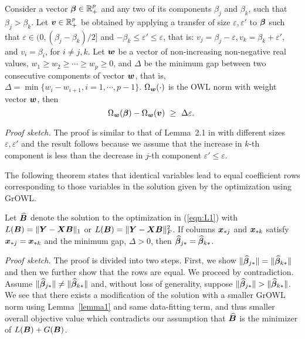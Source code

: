 \begin{lemma}\label{lemma1}
Consider a vector $\boldsymbol{\beta} \in {\mathbb R}^p_+$ and any two of its components $\beta_j$ and $\beta_k$, such that $\beta_j > \beta_k$. Let $\boldsymbol{v} \in {\mathbb R}^p_+$ be obtained by applying a transfer of size $\varepsilon, \varepsilon'$ to $\boldsymbol{\beta}$ such that $\varepsilon \in (0, (\beta_j - \beta_k )/2]$ and $ -\beta_k \leq \varepsilon' \leq \varepsilon$, that is: $v_j = \beta_j - \varepsilon, v_k = \beta_k + \varepsilon'$, and $v_i = \beta_i$, for $i \neq j, k$. Let $\boldsymbol{w}$ be a vector of non-increasing non-negative real values, $w_1 \geq w_2 \geq \cdots \geq w_p \geq 0$, and $\Delta$ be the minimum gap between two consecutive components of vector
$\boldsymbol{w}$, that is, $\Delta = \min\{w_i - w_{i+1}, i = 1, \cdots, p - 1\}$. $\Omega_{\boldsymbol{w}}(\cdot)$ is the OWL norm with weight vector $\boldsymbol{w}$, then
$$\Omega_{\bw}(\bbeta) - \Omega_{\bw}(\bv) \ \geq \ \Delta \varepsilon. \ $$
\end{lemma}

\textit{Proof sketch.}
The proof is similar to that of Lemma~2.1 in \cite{owl} with different sizes
$\varepsilon, \varepsilon'$ and the result follows because we assume that the
increase in $k$-th component is less than the decrease in $j$-th component \ie
$\varepsilon' \leq \varepsilon$.

The following theorem states that identical variables lead to equal coefficient
rows corresponding to those variables in the solution given by the optimization
using GrOWL.

\begin{theorem}\label{ident1}
Let $\widehat {\boldsymbol{B}}$ denote the solution to the optimization in (\ref{eqn:L1}) with $L(\boldsymbol{B}) = \|\boldsymbol{Y} - \boldsymbol{X} \boldsymbol{B} \|_1$ or $L(\boldsymbol{B}) = \|\boldsymbol{Y} - \boldsymbol{X} \boldsymbol{B} \|_F^2$.
If columns $\boldsymbol{x}_{{\ast} j}$ and $\boldsymbol{x}_{{\ast} k}$ satisfy $\boldsymbol{x}_{{\ast} j} = \boldsymbol{x}_{{\ast} k}$ and the minimum gap, $\Delta > 0$, then
$\widehat {\boldsymbol{\beta}}_{j {\ast}} = \widehat {\boldsymbol{\beta}}_{k {\ast}}$.
\end{theorem}

\textit{Proof sketch.}
The proof is divided into two steps. First, we show $\|\widehat {\boldsymbol{\beta}}_{j {\ast}}\| = \|\widehat {\boldsymbol{\beta}}_{k {\ast}}\|$ and then we further show that the rows are equal. 
We proceed by contradiction. Assume $\|\widehat {\boldsymbol{\beta}}_{j {\ast}}\| \neq \|\widehat
{\boldsymbol{\beta}}_{k {\ast}}\|$ and, without loss of generality, suppose $\|\widehat {\boldsymbol{\beta}}_{j
  {\ast}}\| > \|\widehat {\boldsymbol{\beta}}_{k {\ast}}\|$. We see that there exists a modification
of the solution with a smaller GrOWL norm using Lemma~\ref{lemma1} and same
data-fitting term, and thus smaller overall objective value which contradicts
our assumption that $\widehat {\boldsymbol{B}}$ is the minimizer of $L(\boldsymbol{B}) + G(\boldsymbol{B})$.

